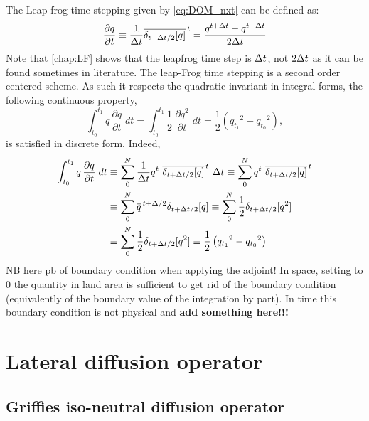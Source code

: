 \documentclass[../main/NEMO_manual]{subfiles}
\begin{document}
The Leap-frog time stepping given by \autoref{eq:DOM_nxt} can be defined as:
\[
  \frac{\partial q}{\partial t}
  \equiv \frac{1}{\Delta t} \overline{ \delta_{t+\Delta t/2}[q]}^{\,t}
  =         \frac{q^{t+\Delta t}-q^{t-\Delta t}}{2\Delta t}
\] 
Note that \autoref{chap:LF} shows that the leapfrog time step is $\Delta t$,
not $2\Delta t$ as it can be found sometimes in literature.
The leap-Frog time stepping is a second order centered scheme.
As such it respects the quadratic invariant in integral forms, \ie the following continuous property,
\[
  \int_{t_0}^{t_1} {q\, \frac{\partial q}{\partial t} \;dt}
  =\int_{t_0}^{t_1} {\frac{1}{2}\, \frac{\partial q^2}{\partial t} \;dt}
  =  \frac{1}{2} \left( {q_{t_1}}^2 - {q_{t_0}}^2 \right) ,
\]
is satisfied in discrete form.
Indeed, 
\[
  \begin{split}
    \int_{t_0}^{t_1} {q\, \frac{\partial q}{\partial t} \;dt}
    &\equiv \sum\limits_{0}^{N}
    {\frac{1}{\Delta t} q^t \ \overline{ \delta_{t+\Delta t/2}[q]}^{\,t} \ \Delta t}
    \equiv \sum\limits_{0}^{N}  { q^t \ \overline{ \delta_{t+\Delta t/2}[q]}^{\,t} } \\
    &\equiv \sum\limits_{0}^{N}  { \overline{q}^{\,t+\Delta/2}{ \delta_{t+\Delta t/2}[q]}}
    \equiv \sum\limits_{0}^{N}  { \frac{1}{2} \delta_{t+\Delta t/2}[q^2] }\\
    &\equiv \sum\limits_{0}^{N}  { \frac{1}{2} \delta_{t+\Delta t/2}[q^2] }
    \equiv \frac{1}{2} \left( {q_{t_1}}^2 - {q_{t_0}}^2 \right)
  \end{split}
\]
NB here pb of boundary condition when applying the adjoint!
In space, setting to 0 the quantity in land area is sufficient to get rid of the boundary condition 
(equivalently of the boundary value of the integration by part).
In time this boundary condition is not physical and \textbf{add something here!!!}


\section{Lateral diffusion operator}

\subsection{Griffies iso-neutral diffusion operator}
\end{document}

